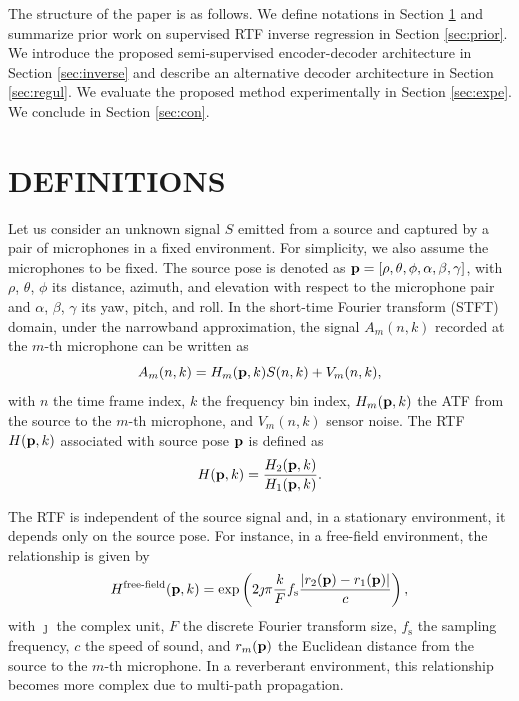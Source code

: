 \documentclass{article}
\begin{document}
The structure of the paper is as follows. We define notations in Section \ref{sec:defs} and summarize prior work on supervised RTF inverse regression in Section \ref{sec:prior}. We introduce the proposed semi-supervised encoder-decoder architecture in Section \ref{sec:inverse} and describe an alternative decoder architecture in Section \ref{sec:regul}. We evaluate the proposed method experimentally in Section \ref{sec:expe}. We conclude in Section \ref{sec:con}.


\section{DEFINITIONS}
\label{sec:defs}
Let us consider an unknown signal $S$ emitted from a source and captured by a pair of microphones in a fixed environment. For simplicity, we also assume the microphones to be fixed. The source pose is denoted as ${\bf p}=[\rho,\theta,\phi,\alpha,\beta,\gamma]$, with $\rho$, $\theta$, $\phi$ its distance, azimuth, and elevation with respect to the microphone pair and $\alpha$, $\beta$, $\gamma$ its yaw, pitch, and roll. In the short-time Fourier transform (STFT) domain, under the narrowband approximation, the signal $A_m(n,k)$ recorded at the $m$-th microphone can be written as
\begin{equation}\label{eq:sigfreq}
  A_m(n,k) = H_m({\bf p},k)S(n,k) + V_m(n,k),
\end{equation}
with $n$ the time frame index, $k$ the frequency bin index, $H_m({\bf p},k)$ the ATF from the source to the $m$-th microphone, and $V_m(n,k)$ sensor noise. The RTF $H({\bf p}, k)$ associated with source pose ${\bf p}$ is defined as
\begin{equation}\label{eq:rtf}
  H({\bf p}, k) = \frac{H_2({\bf p}, k)}{H_1({\bf p}, k)}.
\end{equation}

The RTF is independent of the source signal and, in a stationary environment, it depends only on the source pose. For instance, in a free-field environment, the relationship is given by
\begin{equation}\label{eq:green}
  H^\text{free-field}({\bf p},k)=\exp\left(2\jmath\pi \frac{k}{F}f_\text{s}\frac{|r_2({\bf p}) - r_1({\bf p})|}{c}\right),
\end{equation}
with $\jmath$ the complex unit, $F$ the discrete Fourier transform size, $f_\text{s}$ the sampling frequency, $c$ the speed of sound, and $r_m({\bf p})$ the Euclidean distance from the source to the $m$-th microphone. In a reverberant environment, this relationship becomes more complex due to multi-path propagation.
\end{document}

